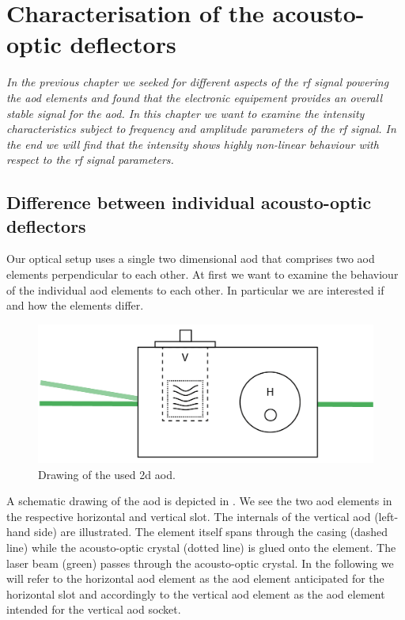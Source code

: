 \chapter{Characterisation of the acousto-optic deflectors}\label{ch:acousto_optic_deflectors}

\textit{In the previous chapter we seeked for different aspects of the
\gls{rf} signal powering the \gls{aod} elements and found that the
electronic equipement provides an overall stable signal for the \gls{aod}.
In this chapter we want to examine the intensity characteristics subject
to frequency and amplitude parameters of the \gls{rf} signal. In the end
we will find that the intensity shows highly non-linear behaviour with
respect to the \gls{rf} signal parameters.}

\section{Difference between individual acousto-optic deflectors}

Our optical setup uses a single two dimensional \gls{aod} that comprises two
\gls{aod} elements perpendicular to each other. At first we want to examine the
behaviour of the individual \gls{aod} elements to each other. In particular we
are interested if and how the elements differ.
\begin{figure}[htb]
  \centering
  \includegraphics[width=\textwidth]{../media/setup/aod-socket.png}
  \caption{Drawing of the used \gls{2d} \gls{aod}.
  }\label{fig:aod_socket}
\end{figure}
A schematic drawing of the \gls{aod} is depicted in . We
see the two \gls{aod} elements in the respective horizontal and vertical slot.
The internals of the vertical \gls{aod} (left-hand side) are illustrated. The
element itself spans through the casing (dashed line) while the acousto-optic
crystal (dotted line) is glued onto the element. The laser beam (green) passes
through the acousto-optic crystal. In the following we will refer to the
horizontal \gls{aod} element as the \gls{aod} element anticipated for the
horizontal slot and accordingly to the vertical \gls{aod} element as the
\gls{aod} element intended for the vertical \gls{aod} socket.

